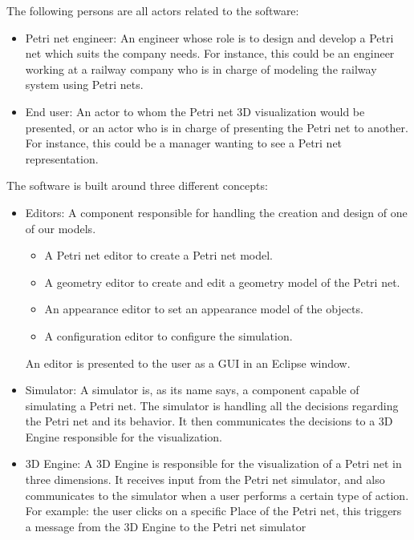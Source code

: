 The following persons are all actors related to the software:

\begin{itemize}
  \item Petri net engineer: An engineer whose role is to design and develop a Petri net which suits the company needs. \newline
  For instance, this could be an engineer working at a railway company who is in charge of modeling the railway system using Petri nets.
  \item End user: An actor to whom the Petri net 3D visualization would be presented, or an actor who is in charge of presenting the Petri net to another. \newline
  For instance, this could be a manager wanting to see a Petri net representation. 
\end{itemize}

The software is built around three different concepts: 

\begin{itemize}
  \item Editors: A component responsible for handling the creation and design of one of our models. 
	\begin{itemize}
	 \item A Petri net editor to create a Petri net model.
	 \item A geometry editor to create and edit a geometry model of the Petri net.
	 \item An appearance editor to set an appearance model of the objects.
	 \item A configuration editor to configure the simulation.
	 \end{itemize}
	An editor is presented to the user as a GUI in an Eclipse window.
  \item Simulator: A simulator is, as its name says, a component capable of simulating a Petri net.
	The simulator is handling all the decisions regarding the Petri net and its behavior. 
	It then communicates the decisions to a 3D Engine responsible for the visualization.
  \item 3D Engine: A 3D Engine is responsible for the visualization of a Petri net in three dimensions.
	It receives input from the Petri net simulator, and also communicates to the simulator when a user performs a certain type of action. \newline
	For example: the user clicks on a specific Place of the Petri net, this triggers a message from the 3D Engine to the Petri net simulator 
\end{itemize}

